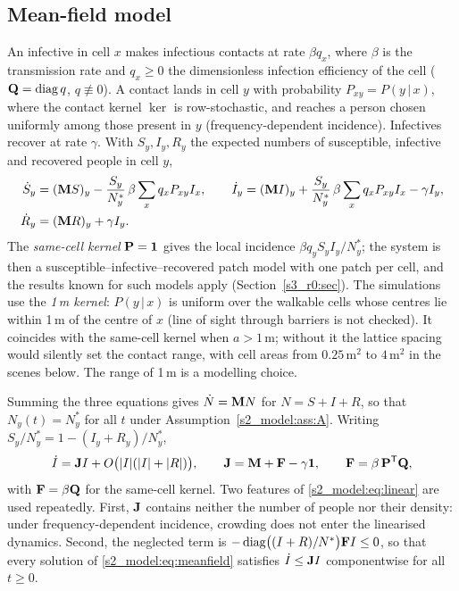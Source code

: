 \subsection{Mean-field model}\label{s2_model:sec:meanfield}

An infective in cell $x$ makes infectious contacts at rate $\beta q_x$, where $\beta$ is the transmission rate
and $q_x\ge0$ the dimensionless infection efficiency of the cell ($\mathbf{Q}=\operatorname{diag} q$, $q\not\equiv0$). A contact
lands in cell $y$ with probability $P_{xy}=P(y\,|\,x)$, where the contact kernel $\ker$ is row-stochastic, and
reaches a person chosen uniformly among those present in $y$ (frequency-dependent incidence). Infectives
recover at rate $\gamma$. With $S_y,I_y,R_y$ the expected numbers of susceptible, infective and recovered
people in cell $y$,
\begin{equation}\label{s2_model:eq:meanfield}
\begin{aligned}
  \dot S_y &= (\mathbf{M} S)_y-\frac{S_y}{N^*_y}\,\beta\sum_{x}q_xP_{xy}I_x ,\qquad
  \dot I_y = (\mathbf{M} I)_y+\frac{S_y}{N^*_y}\,\beta\sum_{x}q_xP_{xy}I_x-\gamma I_y ,\\
  \dot R_y &= (\mathbf{M} R)_y+\gamma I_y .
\end{aligned}
\end{equation}
The \emph{same-cell kernel} $\mathbf{P}=\mathbf{1}$ gives the local incidence $\beta q_yS_yI_y/N^*_y$; the
system is then a susceptible--infective--recovered patch model with one patch per cell, and the results
known for such models apply (Section~\ref{s3_r0:sec}). The simulations use the \emph{1\,m kernel}: $P(y\,|\,x)$
is uniform over the walkable cells whose centres lie within 1\,m of the centre of $x$ (line of sight through
barriers is not checked). It coincides with the same-cell kernel when $a>1$\,m; without it the lattice
spacing would silently set the contact range, with cell areas from $0.25\,\mathrm{m}^2$ to $4\,\mathrm{m}^2$
in the scenes below. The range of 1\,m is a modelling choice.

Summing the three equations gives $\dot N=\mathbf{M} N$ for $N=S+I+R$, so that $N_y(t)=N^*_y$ for all $t$ under
Assumption~\ref{s2_model:ass:A}. Writing $S_y/N^*_y=1-(I_y+R_y)/N^*_y$,
\begin{equation}\label{s2_model:eq:linear}
  \dot I=\mathbf{J} I+O\bigl(|I|(|I|+|R|)\bigr),\qquad \mathbf{J}=\mathbf{M}+\mathbf{F}-\gamma\mathbf{1},\qquad \mathbf{F}=\beta\,\mathbf{P}^{\mathsf{T}}\mathbf{Q} ,
\end{equation}
with $\mathbf{F}=\beta\mathbf{Q}$ for the same-cell kernel. Two features of \eqref{s2_model:eq:linear} are used repeatedly.
First, $\mathbf{J}$ contains neither the number of people nor their density: under frequency-dependent incidence,
crowding does not enter the linearised dynamics. Second, the neglected term is
$-\operatorname{diag}\bigl((I+R)/N^*\bigr)\mathbf{F} I\le0$, so that every solution of \eqref{s2_model:eq:meanfield} satisfies
$\dot I\le\mathbf{J} I$ componentwise for all $t\ge0$.

